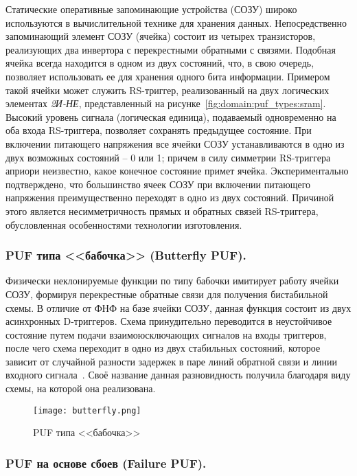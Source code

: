 Статические оперативные запоминающие устройства (СОЗУ) широко используются в вычислительной технике для хранения данных. Непосредственно запоминающий элемент СОЗУ (ячейка) состоит из четырех транзисторов, реализующих два инвертора с перекрестными обратными с связями. Подобная ячейка всегда находится в одном из двух состояний, что, в свою очередь, позволяет использовать ее для хранения одного бита информации. Примером такой ячейки может служить RS-триггер, реализованный на двух логических элементах \emph{2И-НЕ}, представленный на рисунке~\ref{fig:domain:puf_types:sram}. Высокий уровень сигнала (логическая единица), подаваемый одновременно на оба входа RS-триггера, позволяет сохранять предыдущее состояние. При включении питающего напряжения все ячейки СОЗУ устанавливаются в одно из двух возможных состояний -- 0 или 1; причем в силу симметрии RS-триггера априори неизвестно, какое конечное состояние примет ячейка. Экспериментально подтверждено, что большинство ячеек СОЗУ при включении питающего напряжения преимущественно переходят в одно из двух состояний. Причиной этого является несимметричность прямых и обратных связей RS-триггера, обусловленная особенностями технологии изготовления.


\subsubsection{PUF типа <<бабочка>> (Butterfly PUF). }
\label{sub:domain:puf_types:butterfly}
Физически неклонируемые функции по типу бабочки имитирует работу ячейки СОЗУ, формируя перекрестные обратные связи для получения бистабильной схемы. В отличие от ФНФ на базе ячейки СОЗУ, данная функция состоит из двух асинхронных D-триггеров. Схема принудительно переводится в неустойчивое состояние путем подачи взаимоюсключающих сигналов на входы триггеров, после чего схема переходит в одно из двух стабильных состояний, которое зависит от случайной разности задержек в паре линий обратной связи и линии входного сигнала~\cite{yarmolik_vashinko}. Своё название данная разновидность получила благодаря виду схемы, на которой она реализована.
\begin{figure}[ht]
    \centering
    \label{fig:domain:puf_types:butterfly}
    \texttt{[image: butterfly.png]}
    \caption{PUF типа <<бабочка>>}
\end{figure}


\subsubsection{PUF на основе сбоев (Failure PUF). }
\label{sub:domain:puf_types:failure_puf}

